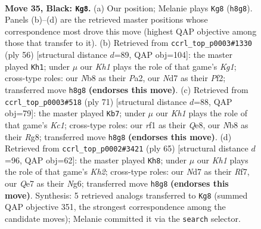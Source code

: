 \documentclass[11pt]{article}
\begin{document}
\clearpage

\begin{figure}[p]\centering
\begin{subfigure}{0.46\textwidth}\centering
\resizebox{\linewidth}{!}{%
\newchessgame
\chessboard[
  setfen={1n3r1k/2pnq2p/rp2p1p1/p3Pp2/P2P1P1P/1RP3N1/1K4PQ/4NR2 b - - 12 35},
  showmover=false,
  pgfstyle=straightmove, color=movearrow, markmove={h8-g8}
]}
\caption{}
\end{subfigure}\hfill
\begin{subfigure}{0.46\textwidth}\centering
\resizebox{\linewidth}{!}{%
\newchessgame
\chessboard[
  setfen={2r5/2qr1ppk/pp1ppnnp/8/2P1P3/1PNRQN1P/P4PP1/3R2K1 w - - 2 29},
  showmover=false,
  pgfstyle=straightmove, color=movearrow, markmove={g1-h1}
]}
\caption{}
\end{subfigure}
\\[4pt]
\begin{subfigure}{0.46\textwidth}\centering
\resizebox{\linewidth}{!}{%
\newchessgame
\chessboard[
  setfen={2k1q1r1/2nr1npp/p3p3/Pp1pPp1P/1BpP1N1Q/2P3R1/2P2PP1/2K4R b - - 37 36},
  showmover=false,
  pgfstyle=straightmove, color=movearrow, markmove={c8-b7}
]}
\caption{}
\end{subfigure}\hfill
\begin{subfigure}{0.46\textwidth}\centering
\resizebox{\linewidth}{!}{%
\newchessgame
\chessboard[
  setfen={4qr2/R1p2rpk/1p1pp1np/1P2p2n/4P2P/2PP1NP1/R4PKN/1Q6 b - - 0 33},
  showmover=false,
  pgfstyle=straightmove, color=movearrow, markmove={h7-h8}
]}
\caption{}
\end{subfigure}
\caption{\textbf{Move 35, Black: \texttt{Kg8}.} (a) Our position; Melanie plays \texttt{Kg8} (\texttt{h8g8}). Panels (b)--(d) are the retrieved master positions whose correspondence most drove this move (highest QAP objective among those that transfer to it). (b) Retrieved from \texttt{ccrl\_top\_p0003\#1330} (ply 56) [structural distance $d$=89, QAP obj=104]: the master played \texttt{Kh1}; under $\mu$ our \emph{Kh1} plays the role of that game's \emph{Kg1}; cross-type roles: our \emph{N}b8 as their \emph{P}a2, our \emph{N}d7 as their \emph{P}f2; transferred move \texttt{h8g8} \textbf{(endorses this move)}. (c) Retrieved from \texttt{ccrl\_top\_p0003\#518} (ply 71) [structural distance $d$=88, QAP obj=79]: the master played \texttt{Kb7}; under $\mu$ our \emph{Kh1} plays the role of that game's \emph{Kc1}; cross-type roles: our \emph{r}f1 as their \emph{Q}e8, our \emph{N}b8 as their \emph{R}g8; transferred move \texttt{h8g8} \textbf{(endorses this move)}. (d) Retrieved from \texttt{ccrl\_top\_p0002\#3421} (ply 65) [structural distance $d$=96, QAP obj=62]: the master played \texttt{Kh8}; under $\mu$ our \emph{Kh1} plays the role of that game's \emph{Kh2}; cross-type roles: our \emph{N}d7 as their \emph{R}f7, our \emph{Q}e7 as their \emph{N}g6; transferred move \texttt{h8g8} \textbf{(endorses this move)}. Synthesis: 5 retrieved analogs transferred to \texttt{Kg8} (summed QAP objective 351, the strongest correspondence among the candidate moves); Melanie committed it via the \texttt{search} selector.}
\label{fig:thought-m69}
\end{figure}
\end{document}
